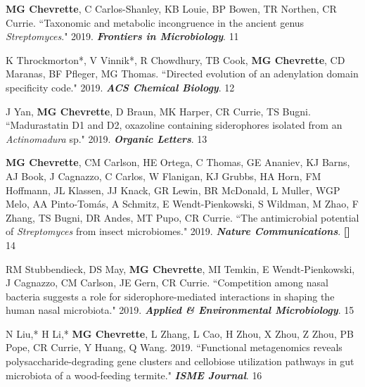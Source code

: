 \begin{cvpubs}
\cvpub
{\textbf{MG Chevrette}, C Carlos-Shanley, KB Louie, BP Bowen, TR Northen, CR Currie. ``Taxonomic and metabolic incongruence in the ancient genus \textit{Streptomyces}." 2019. \textit{\textbf{Frontiers in Microbiology}}. \textbf{\textit{}}}
{11}

\cvpub
{K Throckmorton*, V Vinnik*, R Chowdhury, TB Cook, \textbf{MG Chevrette}, CD Maranas, BF Pfleger, MG Thomas. ``Directed evolution of an adenylation domain specificity code." 2019. \textit{\textbf{ACS Chemical Biology}}. \textbf{\textit{}}}
{12}

\cvpub
{J Yan, \textbf{MG Chevrette}, D Braun, MK Harper, CR Currie, TS Bugni. ``Madurastatin D1 and D2, oxazoline containing siderophores isolated from an \textit{Actinomadura} sp." 2019. \textit{\textbf{Organic Letters}}. \textbf{\textit{}}}
{13}

\cvpub
{\textbf{MG Chevrette}, CM Carlson, HE Ortega, C Thomas, GE Ananiev, KJ Barns, AJ Book, J Cagnazzo, C Carlos, W Flanigan, KJ Grubbs, HA Horn, FM Hoffmann, JL Klassen, JJ Knack, GR Lewin, BR McDonald, L Muller, WGP Melo, AA Pinto-Tom\'{a}s, A Schmitz, E Wendt-Pienkowski, S Wildman, M Zhao, F Zhang, TS Bugni, DR Andes, MT Pupo, CR Currie. ``The antimicrobial potential of \textit{Streptomyces} from insect microbiomes." 2019. \textit{\textbf{Nature Communications}}. \textbf{\textit{}} \linebreak \textbf{[\textit{}]}}
{14}

\cvpub
{RM Stubbendieck, DS May, \textbf{MG Chevrette}, MI Temkin, E Wendt-Pienkowski, J Cagnazzo, CM Carlson, JE Gern, CR Currie. ``Competition among nasal bacteria suggests a role for siderophore-mediated interactions in shaping the human nasal microbiota." 2019. \textit{\textbf{Applied \& Environmental Microbiology}}. \textbf{\textit{}}}
{15}

\cvpub
{N Liu,* H Li,* \textbf{MG Chevrette}, L Zhang, L Cao, H Zhou, X Zhou, Z Zhou, PB Pope, CR Currie, Y Huang, Q Wang. 2019. ``Functional metagenomics reveals polysaccharide-degrading gene clusters and cellobiose utilization pathways in gut microbiota of a wood-feeding termite." \textit{\textbf{ISME Journal}}. \textbf{\textit{}}}
{16}


\end{cvpubs}
